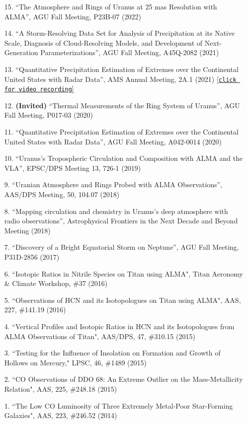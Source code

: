 \documentclass[margin, 10pt]{res} %
\begin{document}
\begin{resume}
\begin{enumerate}
\item[15.] ``The Atmosphere and Rings of Uranus at 25 mas Resolution with ALMA'', AGU Fall Meeting, P23B-07 (2022)
\item[14.] ``A Storm-Resolving Data Set for Analysis of Precipitation at its Native Scale, Diagnosis of Cloud-Resolving Models, and Development of Next-Generation Parameterizations'', AGU Fall Meeting, A45Q-2082 (2021)
\item[13.] ``Quantitative Precipitation Estimation of Extremes over the Continental United States with Radar Data'', AMS Annual Meeting, 2A.1 (2021) \href{https://ams.confex.com/ams/101ANNUAL/meetingapp.cgi/Paper/381114}{[\texttt{click for video recording}]}
\item[12.] \textbf{(Invited)} ``Thermal Measurements of the Ring System of Uranus'', AGU Fall Meeting, P017-03 (2020)
\item[11.] ``Quantitative Precipitation Estimation of Extremes over the Continental United States with Radar Data'', AGU Fall Meeting, A042-0014 (2020)
\item[10.] ``Uranus's Tropospheric Circulation and Composition with ALMA and the VLA'', EPSC/DPS Meeting 13, 726-1 (2019)
\item[9.] ``Uranian Atmosphere and Rings Probed with ALMA Observations'', AAS/DPS Meeting, 50, 104.07 (2018)
\item[8.] ``Mapping circulation and chemistry in Uranus's deep atmosphere with radio observations'', Astrophysical Frontiers in the Next Decade and Beyond Meeting (2018)
\item[7.] ``Discovery of a Bright Equatorial Storm on Neptune'', AGU Fall Meeting, P31D-2856 (2017)
\item[6.] ``Isotopic Ratios in Nitrile Species on Titan using ALMA", Titan Aeronomy \& Climate Workshop, \#37 (2016)
\item[5.] ``Observations of HCN and its Isotopologues on Titan using ALMA", AAS, 227, \#141.19 (2016)
\item[4.] ``Vertical Profiles and Isotopic Ratios in HCN and its Isotopologues from ALMA Observations of Titan", AAS/DPS, 47, \#310.15 (2015)
\item[3.] ``Testing for the Influence of Insolation on Formation and Growth of Hollows on Mercury," LPSC, 46, \#1489 (2015)
\item[2.] ``CO Observations of DDO 68: An Extreme Outlier on the Mass-Metallicity Relation", AAS, 225, \#248.18 (2015)
\item[1.] ``The Low CO Luminosity of Three Extremely Metal-Poor Star-Forming Galaxies", AAS, 223, \#246.52 (2014)


\end{enumerate}
\end{resume}
\end{document}
